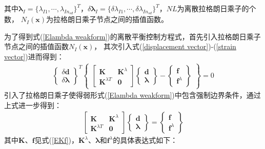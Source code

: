 其中$\pmb \lambda_I=\{\lambda_{I1},\dotsb,\lambda_{In_{sd}}\}^T$，$\delta\pmb \lambda_I=\{\delta\lambda_{I1},\dotsb,\delta\lambda_{In_{sd}}\}^T$，$N\!L$为离散拉格朗日乘子的个数，
$N_I(\pmb{x})$为拉格朗日乘子节点之间的插值函数。\par
为了得到式(\ref{Elambda weakform})的离散平衡控制方程式，首先引入拉格朗日乘子节点之间的插值函数$N_I(\pmb{x})$，
其次引入式(\ref{displacement vector})-(\ref{strain vector})进而得到：
\begin{equation}
\begin{split}
  \left\{\begin{matrix}\delta\pmb{d}\\\delta\pmb{\lambda}\end{matrix}\right\}^T
  \left\{\begin{matrix}
  \left[\begin{matrix}\pmb{K}&\pmb{K}^{\lambda}\\\pmb{K}^{\lambda T}&\pmb{0}\end{matrix}\right]
  \left\{\begin{matrix}\pmb{d}\\\pmb{\lambda}\end{matrix}\right\}-
  \left\{\begin{matrix}\pmb{f}\\\pmb{f}^{\lambda}\end{matrix}\right\}
  \end{matrix}\right\}=0
\end{split}
\end{equation}
引入了拉格朗日乘子使得弱形式(\ref{Elambda weakform})中包含强制边界条件，通过上式进一步得到：
\begin{equation}
\begin{split}
    \left[\begin{matrix}\pmb{K}&\pmb{K}^{\lambda}\\\pmb{K}^{\lambda T}&\pmb{0}\end{matrix}\right]
    \left\{\begin{matrix}\pmb{d}\\\pmb{\lambda}\end{matrix}\right\}=
    \left\{\begin{matrix}\pmb{f}\\\pmb{f}^{\lambda}\end{matrix}\right\}
\end{split}
\end{equation}
其中$\pmb{K}$、$\pmb{f}$见式(\ref{EKf})，$\pmb{K}^{\lambda}$、$\pmb{\lambda}$和$\pmb{f}^{\lambda}$的具体表达式如下：
